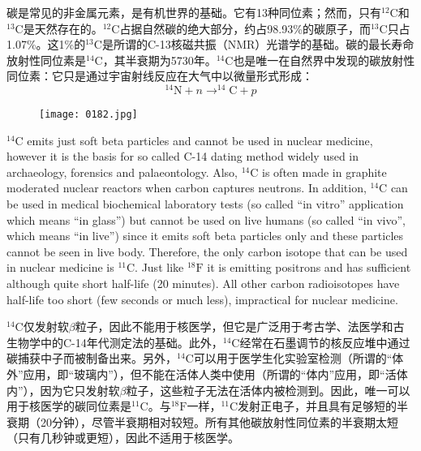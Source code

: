 \documentclass[dvipsnames, svgnames,a4paper,11pt]{article}
\begin{document}
碳是常见的非金属元素，是有机世界的基础。它有13种同位素；然而，只有${}^\mathrm{12}\mathrm{C}$和${}^\mathrm{13}\mathrm{C}$是天然存在的。${}^\mathrm{12}\mathrm{C}$占据自然碳的绝大部分，约占98.93\%的碳原子，而${}^\mathrm{13}\mathrm{C}$只占1.07\%。这1\%的${}^\mathrm{13}\mathrm{C}$是所谓的C-13核磁共振（NMR）光谱学的基础。碳的最长寿命放射性同位素是${}^\mathrm{14}\mathrm{C}$，其半衰期为5730年。${}^\mathrm{14}\mathrm{C}$也是唯一在自然界中发现的碳放射性同位素：它只是通过宇宙射线反应在大气中以微量形式形成：
\[
^{14}\text{N} + n \rightarrow ^{14}\text{C} + p
\]



\begin{figure}[h]
	\centering
    \texttt{[image: 0182.jpg]}  
     \label{fig212}
\end{figure}

${}^\mathrm{14}\mathrm{C}$ emits just soft beta particles and cannot be used in nuclear medicine, however it
is the basis for so called C-14 dating method widely used in archaeology, forensics
and palaeontology. Also, ${}^\mathrm{14}\mathrm{C}$ is often made in graphite moderated nuclear reactors
when carbon captures neutrons. In addition, ${}^\mathrm{14}\mathrm{C}$ can be used in medical biochemical
laboratory tests (so called “in vitro” application which means “in glass”) but cannot be
used on live humans (so called “in vivo”, which means “in live”) since it emits soft
beta particles only and these particles cannot be seen in live body. Therefore, the
only carbon isotope that can be used in nuclear medicine is ${}^\mathrm{11}\mathrm{C}$. Just like ${}^\mathrm{18}\mathrm{F}$ it is
emitting positrons and has sufficient although quite short half-life (20 minutes). All
other carbon radioisotopes have half-life too short (few seconds or much less),
impractical for nuclear medicine.



${}^\mathrm{14}\mathrm{C}$仅发射软$\beta$粒子，因此不能用于核医学，但它是广泛用于考古学、法医学和古生物学中的C-14年代测定法的基础。此外，${}^\mathrm{14}\mathrm{C}$经常在石墨调节的核反应堆中通过碳捕获中子而被制备出来。另外，${}^\mathrm{14}\mathrm{C}$可以用于医学生化实验室检测（所谓的“体外”应用，即“玻璃内”），但不能在活体人类中使用（所谓的“体内”应用，即“活体内”），因为它只发射软$\beta$粒子，这些粒子无法在活体内被检测到。因此，唯一可以用于核医学的碳同位素是${}^\mathrm{11}\mathrm{C}$。与${}^\mathrm{18}\mathrm{F}$一样，${}^\mathrm{11}\mathrm{C}$发射正电子，并且具有足够短的半衰期（20分钟），尽管半衰期相对较短。所有其他碳放射性同位素的半衰期太短（只有几秒钟或更短），因此不适用于核医学。
\end{document}
